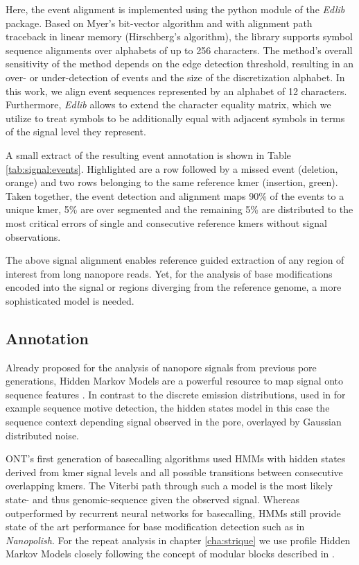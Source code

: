 Here, the event alignment is implemented using the python module of the \textit{Edlib} \cite{Sosic2017} package. Based on Myer's bit-vector algorithm and with alignment path traceback in linear memory (Hirschberg's algorithm), the library supports symbol sequence alignments over alphabets of up to 256 characters. 
The method's overall sensitivity of the method depends on the edge detection threshold, resulting in an over- or under-detection of events and the size of the discretization alphabet. 
In this work, we align event sequences represented by an alphabet of 12 characters. 
Furthermore, \textit{Edlib} allows to extend the character equality matrix, which we utilize to treat symbols to be additionally equal with adjacent symbols in terms of the signal level they represent.

A small extract of the resulting event annotation is shown in Table \ref{tab:signal:events}. Highlighted are a row followed by a missed event (deletion, orange) and two rows belonging to the same reference kmer (insertion, green). 
Taken together, the event detection and alignment maps 90\% of the events to a unique kmer, 5\% are over segmented and the remaining 5\% are distributed to the most critical errors of single and consecutive reference kmers without signal observations.

The above signal alignment enables reference guided extraction of any region of interest from long nanopore reads. Yet, for the analysis of base modifications encoded into the signal or regions diverging from the reference genome, a more sophisticated model is needed.




\subsection{Annotation}
\label{subsec:signal:annotation}

Already proposed for the analysis of nanopore signals from previous pore generations, Hidden Markov Models are a powerful resource to map signal onto sequence features \cite{Schreiber2015}. In contrast to the discrete emission distributions, used in for example sequence motive detection, the hidden states model in this case the sequence context depending signal observed in the pore, overlayed by Gaussian distributed noise.

ONT's first generation of basecalling algorithms used HMMs with hidden states derived from kmer signal levels and all possible transitions between consecutive overlapping kmers. 
The Viterbi path through such a model is the most likely state- and thus genomic-sequence given the observed signal. 
Whereas outperformed by recurrent neural networks for basecalling, HMMs still provide state of the art performance for base modification detection such as in \textit{Nanopolish}. 
For the repeat analysis in chapter \ref{cha:strique} we use profile Hidden Markov Models closely following the concept of modular blocks described in \cite{Schreiber2015}.

